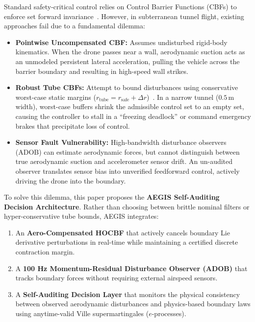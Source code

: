 \documentclass[11pt,a4paper]{article}
\begin{document}
\begin{tcolorbox}[calloutbox, title=The Aerodynamic Invariance Dilemma in Tunnels]
Standard safety-critical control relies on Control Barrier Functions (CBFs) to enforce set forward invariance~\cite{ames2016control, ames2019control}. However, in subterranean tunnel flight, existing approaches fail due to a fundamental dilemma:
\begin{itemize}[leftmargin=14pt, itemsep=1pt]
    \item \textbf{Pointwise Uncompensated CBF:} Assumes undisturbed rigid-body kinematics. When the drone passes near a wall, aerodynamic suction acts as an unmodeled persistent lateral acceleration, pulling the vehicle across the barrier boundary and resulting in high-speed wall strikes.
    \item \textbf{Robust Tube CBFs:} Attempt to bound disturbances using conservative worst-case static margins ($r_{\text{tube}} = r_{\text{safe}} + \Delta r$)~\cite{gurriet2018towards}. In a narrow tunnel ($0.5\,$m width), worst-case buffers shrink the admissible control set to an empty set, causing the controller to stall in a ``freezing deadlock'' or command emergency brakes that precipitate loss of control.
    \item \textbf{Sensor Fault Vulnerability:} High-bandwidth disturbance observers (ADOB) can estimate aerodynamic forces, but cannot distinguish between true aerodynamic suction and accelerometer sensor drift. An un-audited observer translates sensor bias into unverified feedforward control, actively driving the drone into the boundary.
\end{itemize}
\end{tcolorbox}

To solve this dilemma, this paper proposes the \textbf{AEGIS Self-Auditing Decision Architecture}. Rather than choosing between brittle nominal filters or hyper-conservative tube bounds, AEGIS integrates:
\begin{enumerate}[leftmargin=18pt, itemsep=2pt]
    \item An \textbf{Aero-Compensated HOCBF} that actively cancels boundary Lie derivative perturbations in real-time while maintaining a certified discrete contraction margin.
    \item A \textbf{100 Hz Momentum-Residual Disturbance Observer (ADOB)} that tracks boundary forces without requiring external airspeed sensors.
    \item A \textbf{Self-Auditing Decision Layer} that monitors the physical consistency between observed aerodynamic disturbances and physics-based boundary laws using anytime-valid Ville supermartingales ($e$-processes).
\end{enumerate}
\end{document}

